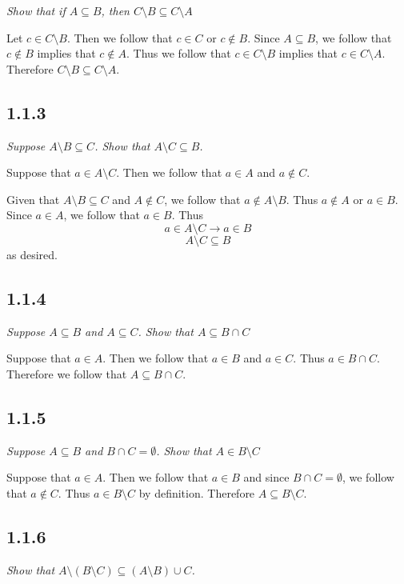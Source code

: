 \documentclass[11pt,oneside,titlepage]{book}
\begin{document}
\textit{Show that if $A \subseteq B$, then $C \setminus B \subseteq C \setminus A$}

Let $c \in C \setminus B$. Then we follow that $c \in C$ or $c \notin B$. Since $A \subseteq B$,
we follow that $c \notin B$ implies that $c \notin A$. Thus we follow that
$c \in C \setminus B$ implies that $c \in C \setminus A$. Therefore $C \setminus B \subseteq
C \setminus A$.

\subsection*{1.1.3}

\textit{Suppose $A \setminus B \subseteq C$. Show that $A \setminus C \subseteq B$.}

Suppose that $a \in A \setminus C$. Then we follow that $a \in A$ and $a \notin C$.

Given that $A \setminus B \subseteq C$ and $A \notin C$, we follow that $a \notin A \setminus B$.
Thus $a \notin A$ or $a \in B$. Since $a \in A$, we follow that $a \in B$. Thus
$$a \in A \setminus C \to a \in B$$
$$A \setminus C \subseteq  B$$
as desired.

\subsection*{1.1.4}

\textit{Suppose $A \subseteq B$ and $A \subseteq C$. Show that $A \subseteq B \cap C$}

Suppose that $a \in A$. Then we follow that $a \in B$ and $a \in C$. Thus $a \in B \cap C$.
Therefore we follow that $A \subseteq B \cap C$.

\subsection*{1.1.5}

\textit{Suppose $A \subseteq B$ and $B \cap C = \emptyset$. Show that $A \in B \setminus C$}

Suppose that $a \in A$. Then we follow that $a \in B$ and since $B \cap C = \emptyset$, we
follow that $a \notin C$. Thus $a \in B \setminus C$ by definition. Therefore
$A \subseteq B \setminus C$.

\subsection*{1.1.6}

\textit{Show that $A \setminus (B \setminus C) \subseteq (A \setminus B) \cup C$.}
\end{document}
